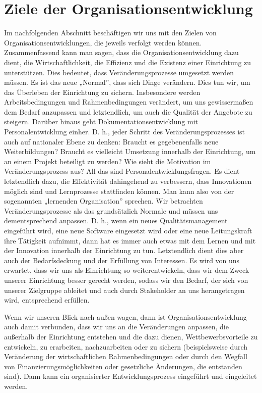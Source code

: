 \documentclass[
  letterpaper,
]{book}
\begin{document}
\section{Ziele der
Organisationsentwicklung}\label{ziele-der-organisationsentwicklung}

Im nachfolgenden Abschnitt beschäftigen wir uns mit den Zielen von
Organisationsentwicklungen, die jeweils verfolgt werden können.
Zusammenfassend kann man sagen, dass die Organisationsentwicklung dazu
dient, die Wirtschaftlichkeit, die Effizienz und die Existenz einer
Einrichtung zu unterstützen. Dies bedeutet, dass Veränderungsprozesse
umgesetzt werden müssen. Es ist das neue „Normal'', dass sich Dinge
verändern. Dies tun wir, um das Überleben der Einrichtung zu sichern.
Insbesondere werden Arbeitsbedingungen und Rahmenbedingungen verändert,
um uns gewissermaßen dem Bedarf anzupassen und letztendlich, um auch die
Qualität der Angebote zu steigern. Darüber hinaus geht
Dokumentationsentwicklung mit Personalentwicklung einher. D. h., jeder
Schritt des Veränderungsprozesses ist auch auf nationaler Ebene zu
denken: Braucht es gegebenenfalls neue Weiterbildungen? Braucht es
vielleicht Umsetzung innerhalb der Einrichtung, um an einem Projekt
beteiligt zu werden? Wie sieht die Motivation im Veränderungsprozess
aus? All das sind Personalentwicklungsfragen. Es dient letztendlich
dazu, die Effektivität dahingehend zu verbessern, dass Innovationen
möglich sind und Lernprozesse stattfinden können. Man kann also von der
sogenannten „lernenden Organisation'' sprechen. Wir betrachten
Veränderungsprozesse als das grundsätzlich Normale und müssen uns
dementsprechend anpassen. D. h., wenn ein neues Qualitätsmanagement
eingeführt wird, eine neue Software eingesetzt wird oder eine neue
Leitungskraft ihre Tätigkeit aufnimmt, dann hat es immer auch etwas mit
dem Lernen und mit der Innovation innerhalb der Einrichtung zu tun.
Letztendlich dient dies aber auch der Bedarfsdeckung und der Erfüllung
von Interessen. Es wird von uns erwartet, dass wir uns als Einrichtung
so weiterentwickeln, dass wir dem Zweck unserer Einrichtung besser
gerecht werden, sodass wir den Bedarf, der sich von unserer Zielgruppe
ableitet und auch durch Stakeholder an uns herangetragen wird,
entsprechend erfüllen.

Wenn wir unseren Blick nach außen wagen, dann ist
Organisationsentwicklung auch damit verbunden, dass wir uns an die
Veränderungen anpassen, die außerhalb der Einrichtung entstehen und die
dazu dienen, Wettbewerbsvorteile zu entwickeln, zu erarbeiten,
nachzuarbeiten oder zu sichern (beispielsweise durch Veränderung der
wirtschaftlichen Rahmenbedingungen oder durch den Wegfall von
Finanzierungsmöglichkeiten oder gesetzliche Änderungen, die entstanden
sind). Dann kann ein organisierter Entwicklungsprozess eingeführt und
eingeleitet werden.
\end{document}

